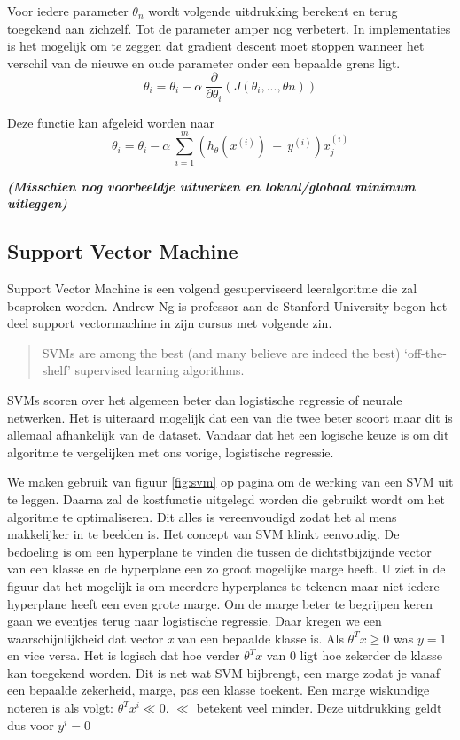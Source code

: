 Voor iedere parameter $\theta_{n}$ wordt volgende uitdrukking berekent en terug toegekend aan zichzelf. Tot de parameter amper nog verbetert. In implementaties is het mogelijk om te zeggen dat gradient descent moet stoppen wanneer het verschil van de nieuwe en oude parameter onder een bepaalde grens ligt. 
$$
\theta_{i} = \theta_{i} - \alpha\:\frac{\partial}{\partial\theta_{i}}(J(\theta_{i}, ... , \theta{n}))
$$

Deze functie kan afgeleid worden naar 
$$
\theta_{i} = \theta_{i} - \alpha\:\sum_{i=1}^{m}(h_{\theta}(x^{(i)})\:-\:y^{(i)} ) x_{j}^{(i) }
$$

\textbf{\textit{(Misschien nog voorbeeldje uitwerken en lokaal/globaal minimum uitleggen)}}


\subsection{Support Vector Machine}
\label{sec:Support-Vector-Machine}
Support Vector Machine is een volgend gesuperviseerd leeralgoritme die zal besproken worden. 
Andrew Ng is professor aan de Stanford University begon het deel support vectormachine in zijn cursus \autocite{cursusAndrewNg} met volgende zin.
\begin{quote}
	SVMs are among the best (and many believe are indeed the best) ‘off-the-shelf’ supervised learning algorithms.
\end{quote}

SVMs scoren over het algemeen beter dan logistische regressie of neurale netwerken. Het is uiteraard mogelijk dat een van die twee beter scoort maar dit is allemaal afhankelijk van de dataset. Vandaar dat het een logische keuze is om dit algoritme te vergelijken met ons vorige, logistische regressie. 

We maken gebruik van figuur \ref{fig:svm} op pagina \pageref{fig:svm} om de werking van een SVM uit te leggen. Daarna zal de kostfunctie uitgelegd worden die gebruikt wordt om het algoritme te optimaliseren. Dit alles is vereenvoudigd zodat het al mens makkelijker in te beelden is.
Het concept van SVM klinkt eenvoudig. De bedoeling is om een hyperplane te vinden die tussen de dichtstbijzijnde vector van een klasse en de hyperplane een zo groot mogelijke marge heeft. U ziet in de figuur dat het mogelijk is om meerdere hyperplanes te tekenen maar niet iedere hyperplane heeft een even grote marge. Om de marge beter te begrijpen keren gaan we eventjes terug naar logistische regressie. Daar kregen we een waarschijnlijkheid dat vector \textit{x} van een bepaalde klasse is. Als $\theta^{T}x \geq 0$ was $y=1$ en vice versa. Het is logisch dat hoe verder $\theta^{T}x$ van 0 ligt hoe zekerder de klasse kan toegekend worden. Dit is net wat SVM bijbrengt, een marge zodat je vanaf een bepaalde zekerheid, marge, pas een klasse toekent. Een marge wiskundige noteren is als volgt: $\theta^{T}x^{i} \ll 0$. $\ll$ betekent veel minder. Deze uitdrukking geldt dus voor $y^{i}=0$
 
